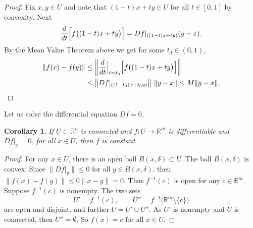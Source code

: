 \documentclass[12pt,openany]{book}
\newcommand{\snorm}[1]{\lVert {#1} \rVert}
\newcommand{\norm}[1]{\left\lVert {#1} \right\rVert}
\newcommand{\R}{{\mathbb{R}}}
\theoremstyle{plain}
\newtheorem{cor}[thm]{Corollary}
\theoremstyle{remark}
\theoremstyle{definition}
\theoremstyle{exercise}
\theoremstyle{example}
\begin{document}
\begin{proof}
Fix $x,y \in U$ and note that
$(1-t)x+ty \in U$ for all $t \in [0,1]$
by convexity.
Next
\begin{equation*}
\frac{d}{dt} \Bigl[f\bigl((1-t)x+ty\bigr)\Bigr]
=
Df|_{((1-t)x+ty)} (y-x) .
\end{equation*}
By the Mean Value Theorem above we get for
some $t_0 \in (0,1)$,
\begin{equation*}
\begin{split}
\snorm{f(x)-f(y)} & \leq
\norm{\frac{d}{dt} \Big|_{t=t_0} \Bigl[ f\bigl((1-t)x+ty\bigr) \Bigr] }
\\
& \leq
\norm{Df|_{((1-t_0)x+t_0y)}} \, \snorm{y-x} \leq
M \snorm{y-x} . \qedhere
\end{split}
\end{equation*}
\end{proof}

Let us solve the differential equation $Df = 0$.

\begin{cor} \label{thm:svzerodersol}
If $U \subset \R^n$ is connected and $f \colon U \to \R^m$ is differentiable
and $Df|_x = 0$, for all $x \in U$, then $f$ is constant.
\end{cor}

\begin{proof}
For any $x \in U$, there is an open ball $B(x,\delta) \subset U$.  The ball
$B(x,\delta)$ is convex.  Since
$\snorm{Df|_y} \leq 0$ for all $y \in B(x,\delta)$, then
$\snorm{f(x)-f(y)} \leq 0 \snorm{x-y} = 0$.
Thus $f^{-1}(c)$ is open for any $c \in \R^m$.  Suppose
$f^{-1}(c)$ is nonempty.  
The two sets
\begin{equation*}
U' = f^{-1}(c), \qquad U'' = f^{-1}\bigl(\R^m\setminus\{c\}\bigr)
\end{equation*}
are open and disjoint, and further $U = U' \cup U''$.  As $U'$ is nonempty
and $U$ is connected, then $U'' = \emptyset$.  So $f(x) = c$ for all $x \in U$.
\end{proof}
\end{document}
